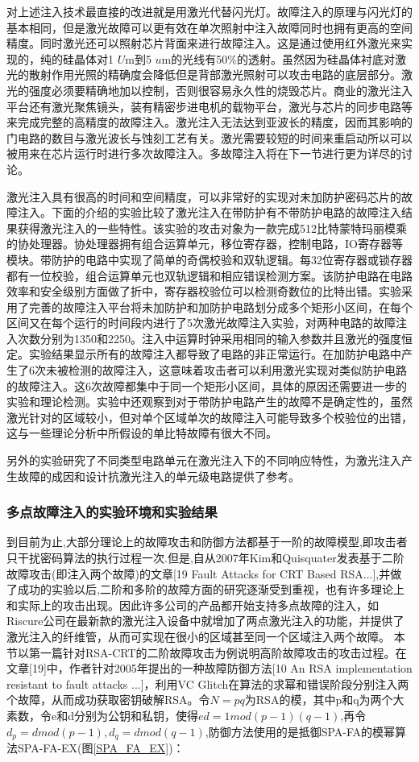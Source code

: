 \documentclass[a4paper,12pt]{article}
\begin{document}
\begin{CJK}{UTF8}{gkai}
对上述注入技术最直接的改进就是用激光代替闪光灯。故障注入的原理与闪光灯的基本相同，但是激光故障可以更有效在单次照射中注入故障同时也拥有更高的空间精度。同时激光还可以照射芯片背面来进行故障注入。这是通过使用红外激光来实现的，纯的硅晶体对1 $U$m到5 $u$m的光线有50\%的透射。虽然因为硅晶体衬底对激光的散射作用光照的精确度会降低但是背部激光照射可以攻击电路的底层部分。激光的强度必须要精确地加以控制，否则很容易永久性的烧毁芯片。商业的激光注入平台还有激光聚焦镜头，装有精密步进电机的载物平台，激光与芯片的同步电路等来完成完整的高精度的故障注入。激光注入无法达到亚波长的精度，因而其影响的门电路的数目与激光波长与蚀刻工艺有关。激光需要较短的时间来重启动所以可以被用来在芯片运行时进行多次故障注入。多故障注入将在下一节进行更为详尽的讨论。

激光注入具有很高的时间和空间精度，可以非常好的实现对未加防护密码芯片的故障注入。下面的介绍的实验比较了激光注入在带防护有不带防护电路的故障注入结果获得激光注入的一些特性。该实验的攻击对象为一款完成512比特蒙特玛丽模乘的协处理器。协处理器拥有组合运算单元，移位寄存器，控制电路，IO寄存器等模块。带防护的电路中实现了简单的奇偶校验和双轨逻辑。每32位寄存器或锁存器都有一位校验，组合运算单元也双轨逻辑和相应错误检测方案。该防护电路在电路效率和安全级别方面做了折中，寄存器校验位可以检测奇数位的比特出错。实验采用了完善的故障注入平台将未加防护和加防护电路划分成多个矩形小区间，在每个区间又在每个运行的时间段内进行了5次激光故障注入实验，对两种电路的故障注入次数分别为1350和2250。注入中运算时钟采用相同的输入参数并且激光的强度恒定。实验结果显示所有的故障注入都导致了电路的非正常运行。在加防护电路中产生了6次未被检测的故障注入，这意味着攻击者可以利用激光实现对类似防护电路的故障注入。这6次故障都集中于同一个矩形小区间，具体的原因还需要进一步的实验和理论检测。实验中还观察到对于带防护电路产生的故障不是确定性的，虽然激光针对的区域较小，但对单个区域单次的故障注入可能导致多个校验位的出错，这与一些理论分析中所假设的单比特故障有很大不同。

另外的实验研究了不同类型电路单元在激光注入下的不同响应特性，为激光注入产生故障的成因和设计抗激光注入的单元级电路提供了参考。
\subsubsection{多点故障注入的实验环境和实验结果}
到目前为止,大部分理论上的故障攻击和防御方法都基于一阶的故障模型,即攻击者只干扰密码算法的执行过程一次.但是,自从2007年Kim和Quisquater发表基于二阶故障攻击(即注入两个故障)的文章[19 Fault Attacks for CRT Based RSA...],并做了成功的实验以后,二阶和多阶的故障方面的研究逐渐受到重视，也有许多理论上和实际上的攻击出现。因此许多公司的产品都开始支持多点故障的注入，如Riscure公司在最新款的激光注入设备中就增加了两点激光注入的功能，并提供了激光注入的纤维管，从而可实现在很小的区域甚至同一个区域注入两个故障。
本节以第一篇针对RSA-CRT的二阶故障攻击为例说明高阶故障攻击的攻击过程。在文章[19]中，作者针对2005年提出的一种故障防御方法[10 An RSA implementation resistant to fault attacks ...]，利用VC Glitch在算法的求幂和错误阶段分别注入两个故障，从而成功获取密钥破解RSA。令$N=pq$为RSA的模，其中p和q为两个大素数，令e和d分别为公钥和私钥，使得$ed = 1 mod (p-1)(q-1)$,再令$d_p = d mod (p-1), d_q = d mod (q-1)$,防御方法使用的是抵御SPA-FA的模幂算法SPA-FA-EX(图\ref{SPA_FA_EX})：


\end{CJK}
\end{document}
